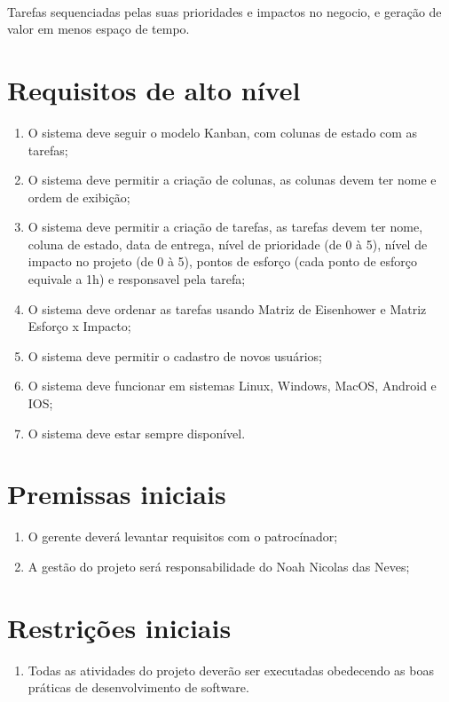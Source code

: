   \paragraph{}
    Tarefas sequenciadas pelas suas prioridades e impactos no negocio, e geração de valor em menos espaço de tempo.

\section{Requisitos de alto nível}
  \begin{enumerate}
    \item O sistema deve seguir o modelo Kanban, com colunas de estado com as tarefas;

    \item O sistema deve permitir a criação de colunas, as colunas devem ter nome e ordem de exibição;

    \item O sistema deve permitir a criação de tarefas, as tarefas devem ter nome, coluna de estado, data de entrega, nível de prioridade (de 0 à 5), nível de impacto no projeto (de 0 à 5), pontos de esforço (cada ponto de esforço equivale a 1h) e responsavel pela tarefa;

    \item O sistema deve ordenar as tarefas usando Matriz de Eisenhower e Matriz Esforço x Impacto;

    \item O sistema deve permitir o cadastro de novos usuários;

    \item O sistema deve funcionar em sistemas Linux, Windows, MacOS, Android e IOS;

    \item O sistema deve estar sempre disponível.
  \end{enumerate}

\section{Premissas iniciais}
  \begin{enumerate}
    \item  O gerente deverá levantar requisitos com o patrocínador;

    \item  A gestão do projeto será responsabilidade do Noah Nicolas das Neves;
  \end{enumerate}

\section{Restrições iniciais}
  \begin{enumerate}
    \item Todas as atividades do projeto deverão ser executadas obedecendo as boas práticas de desenvolvimento de software.
  \end{enumerate}

